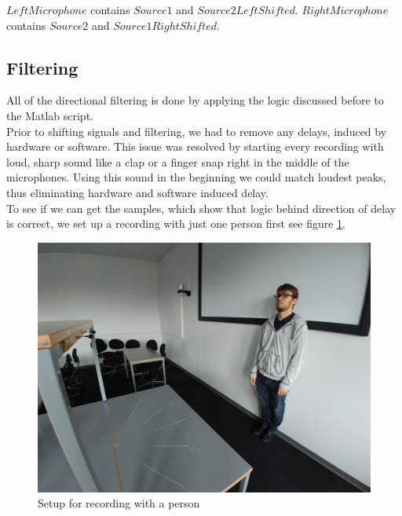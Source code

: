 \newpage

$LeftMicrophone$ contains $Source1$ and $Source2LeftShifted$. $RightMicrophone$ contains $Source2$
and $Source1RightShifted$.


\newpage
\subsection{Filtering}
All of the directional filtering is done by applying the logic discussed before to the Matlab script.\\
Prior to shifting signals and filtering, we had to remove any delays, induced by hardware or software. This 
issue was resolved by starting every recording with loud, sharp sound like a clap or a finger snap right in 
the middle of the microphones. Using this sound in the beginning we could match loudest peaks, thus 
eliminating hardware and software induced delay. \\
To see if we can get the samples, which show that logic behind direction of delay is correct, we set up a 
recording with just one person first see figure \ref{fig:RanzvanRecSetup}.\\

\begin{figure}[htp]
	\centering
	\includegraphics[width=.7\textwidth]{Illustrations/razvanWithSetup.jpg}
	\caption{Setup for recording with a person}
	\label{fig:RanzvanRecSetup}
\end{figure}

